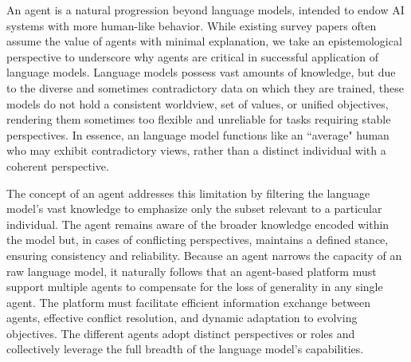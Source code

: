 An agent is a natural progression beyond language models, intended to endow AI systems with more human-like behavior. While existing survey papers often assume the value of agents with minimal explanation, we take an epistemological perspective to underscore why agents are critical in successful application of language models. Language models possess vast amounts of knowledge, but due to the diverse and sometimes contradictory data on which they are trained, these models do not hold a consistent worldview, set of values, or unified objectives, rendering them sometimes too flexible and unreliable for tasks requiring stable perspectives. In essence, an language model functions like an ``average" human who may exhibit contradictory views, rather than a distinct individual with a coherent perspective.

The concept of an agent addresses this limitation by filtering the language model’s vast knowledge to emphasize only the subset relevant to a particular individual. The agent remains aware of the broader knowledge encoded within the model but, in cases of conflicting perspectives, maintains a defined stance, ensuring consistency and reliability.
Because an agent narrows the capacity of an raw language model, it naturally follows that an agent-based  platform must support multiple agents to compensate for the loss of generality in any single agent. The platform must facilitate efficient information exchange between agents, effective conflict resolution, and dynamic adaptation to evolving objectives. The different agents adopt distinct perspectives or roles and collectively leverage the full breadth of the language model's capabilities.

